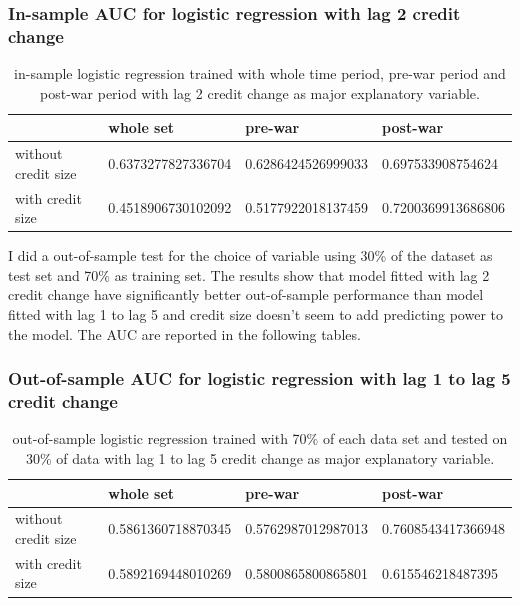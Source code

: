 \documentclass{article}
\begin{document}
\subsubsection*{\centering{}In-sample AUC for logistic regression with lag 2 credit change}

\begin{table}[H]
    \caption{in-sample logistic regression trained with whole time period,
    pre-war period and post-war period with lag 2 credit change as major
    explanatory variable.}
    \begin{center}\begin{tabular}{|l|l|l|l|}
    \hline
                        & whole set          & pre-war            & post-war           \\ \hline
    without credit size & 0.6373277827336704 & 0.6286424526999033 & 0.697533908754624  \\ \hline
    with credit size    & 0.4518906730102092 & 0.5177922018137459 & 0.7200369913686806 \\ \hline
    \end{tabular}\end{center}
\end{table}

I did a out-of-sample test for the choice of variable using
30\% of the dataset as test set and 70\% as training set.
The results show that model fitted with lag 2 credit change have
significantly better out-of-sample performance than model fitted with
lag 1 to lag 5 and credit size doesn't seem to add predicting
power to the model. The AUC are reported in the following tables.

\subsubsection*{\centering{}Out-of-sample AUC for logistic regression with lag 1 to lag 5 credit change}

\begin{table}[H]
    \caption{out-of-sample logistic regression trained with 70\% of
    each data set and tested on 30\% of data with lag 1 to lag 5
    credit change as major explanatory variable.}
    \begin{center}\begin{tabular}{|l|l|l|l|}
    \hline
                        & whole set          & pre-war            & post-war           \\ \hline
    without credit size & 0.5861360718870345 & 0.5762987012987013 & 0.7608543417366948 \\ \hline
    with credit size    & 0.5892169448010269 & 0.5800865800865801 & 0.615546218487395  \\ \hline
    \end{tabular}\end{center}
\end{table}
\end{document}

